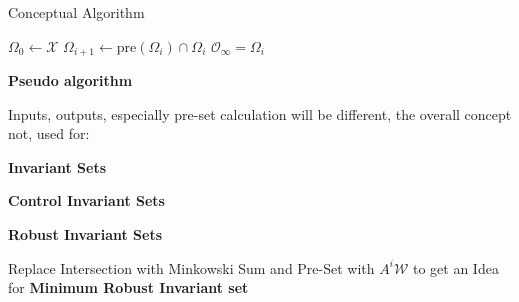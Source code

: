 \begin{sstTitleBox}[ForestGreen]{
		Conceptual Algorithm
	}

	\begin{minipage}{0.53\linewidth}
		\begin{sstFullFrame}[ForestGreen]
			\vspace{1.2mm}
			\color{white}
			\begin{algorithmic}
				\State $\Omega_0 \leftarrow \mathcal{X}$
				\Loop
				\State $\Omega_{i+1} \leftarrow \mathrm{pre}(\Omega_i)\cap\Omega_i$
				\State\Return $\mathcal{O}_\infty = \Omega_i$
				\EndIf
				\EndLoop
			\end{algorithmic}
			\vspace{1.1mm}
		\end{sstFullFrame}
	\end{minipage}
	\begin{minipage}{0.46\linewidth}
		\begin{sstOnlyFrame}[ForestGreen]
			\textbf{Pseudo algorithm}

			Inputs, outputs, especially
			pre-set calculation will be different,
			the overall concept not, used for:

			\textbf{Invariant Sets}

			\textbf{Control Invariant Sets}

			\textbf{Robust Invariant Sets}

		\end{sstOnlyFrame}
	\end{minipage}
	\begin{sstOnlyFrame}[ForestGreen]
		Replace Intersection with Minkowski Sum and
		Pre-Set with $A^i\mathcal{W}$ to get an Idea for
		\textbf{Minimum Robust Invariant set}
	\end{sstOnlyFrame}
\end{sstTitleBox}
\vspace{-3mm}
